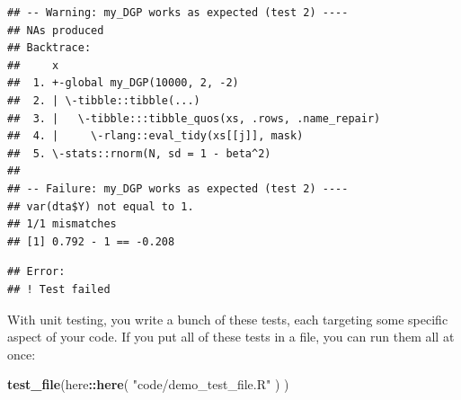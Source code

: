 \documentclass[
]{book}
\newenvironment{Shaded}{\begin{snugshade}}{\end{snugshade}}
\newcommand{\AttributeTok}[1]{\textcolor[rgb]{0.13,0.29,0.53}{#1}}
\newcommand{\DecValTok}[1]{\textcolor[rgb]{0.00,0.00,0.81}{#1}}
\newcommand{\FloatTok}[1]{\textcolor[rgb]{0.00,0.00,0.81}{#1}}
\newcommand{\FunctionTok}[1]{\textcolor[rgb]{0.13,0.29,0.53}{\textbf{#1}}}
\newcommand{\NormalTok}[1]{#1}
\newcommand{\OtherTok}[1]{\textcolor[rgb]{0.56,0.35,0.01}{#1}}
\newcommand{\SpecialCharTok}[1]{\textcolor[rgb]{0.81,0.36,0.00}{\textbf{#1}}}
\newcommand{\StringTok}[1]{\textcolor[rgb]{0.31,0.60,0.02}{#1}}
\begin{document}
\begin{Shaded}
\end{Shaded}

\begin{verbatim}
## -- Warning: my_DGP works as expected (test 2) ----
## NAs produced
## Backtrace:
##     x
##  1. +-global my_DGP(10000, 2, -2)
##  2. | \-tibble::tibble(...)
##  3. |   \-tibble:::tibble_quos(xs, .rows, .name_repair)
##  4. |     \-rlang::eval_tidy(xs[[j]], mask)
##  5. \-stats::rnorm(N, sd = 1 - beta^2)
## 
## -- Failure: my_DGP works as expected (test 2) ----
## var(dta$Y) not equal to 1.
## 1/1 mismatches
## [1] 0.792 - 1 == -0.208
\end{verbatim}

\begin{verbatim}
## Error:
## ! Test failed
\end{verbatim}

With unit testing, you write a bunch of these tests, each targeting some specific aspect of your code.
If you put all of these tests in a file, you can run them all at once:

\begin{Shaded}
\begin{Highlighting}[]
\FunctionTok{test\_file}\NormalTok{(here}\SpecialCharTok{::}\FunctionTok{here}\NormalTok{( }\StringTok{"code/demo\_test\_file.R"}\NormalTok{ ) )}
\end{Highlighting}
\end{Shaded}
\end{document}
